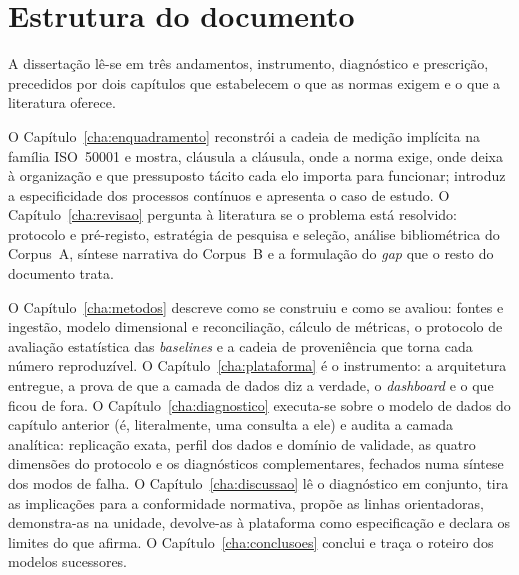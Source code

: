 \section{Estrutura do documento}
\label{sec:estrutura}

A dissertação lê-se em três andamentos, instrumento, diagnóstico e
prescrição, precedidos por dois capítulos que estabelecem o que as
normas exigem e o que a literatura oferece.

O Capítulo~\ref{cha:enquadramento} reconstrói a cadeia de medição
implícita na família ISO~50001 e mostra, cláusula a cláusula, onde a
norma exige, onde deixa à organização e que pressuposto tácito cada elo
importa para funcionar; introduz a especificidade dos processos
contínuos e apresenta o caso de estudo. O Capítulo~\ref{cha:revisao}
pergunta à literatura se o problema está resolvido: protocolo e
pré-registo, estratégia de pesquisa e seleção, análise bibliométrica do
Corpus~A, síntese narrativa do Corpus~B e a formulação do \emph{gap}
que o resto do documento trata.

O Capítulo~\ref{cha:metodos} descreve como se construiu e como se
avaliou: fontes e ingestão, modelo dimensional e reconciliação, cálculo
de métricas, o protocolo de avaliação estatística das \emph{baselines}
e a cadeia de proveniência que torna cada número reproduzível. O
Capítulo~\ref{cha:plataforma} é o instrumento: a arquitetura entregue,
a prova de que a camada de dados diz a verdade, o \emph{dashboard} e o
que ficou de fora. O Capítulo~\ref{cha:diagnostico} executa-se sobre o
modelo de dados do capítulo anterior (é, literalmente, uma consulta a
ele) e audita a camada analítica: replicação exata, perfil dos dados e
domínio de validade, as quatro dimensões do protocolo e os diagnósticos
complementares, fechados numa síntese dos modos de falha. O
Capítulo~\ref{cha:discussao} lê o diagnóstico em conjunto, tira as
implicações para a conformidade normativa, propõe as linhas
orientadoras, demonstra-as na unidade, devolve-as à plataforma como
especificação e declara os limites do que afirma. O
Capítulo~\ref{cha:conclusoes} conclui e traça o roteiro dos modelos
sucessores.


